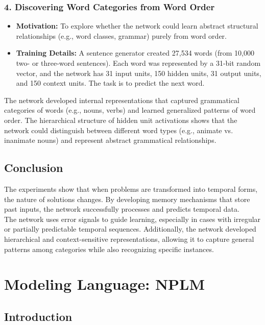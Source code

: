 \documentclass[11p,oneside]{book}
\begin{document}
\subsection*{4. Discovering Word Categories from Word Order}

\begin{itemize}
    \item \textbf{Motivation:} To explore whether the network could learn abstract structural relationships (e.g., word classes, grammar) purely from word order.
    \item \textbf{Training Details:} A sentence generator created 27,534 words (from 10,000 two- or three-word sentences). Each word was represented by a 31-bit random vector, and the network has 31 input units, 150 hidden units, 31 output units, and 150 context units. The task is to predict the next word.
\end{itemize}

The network developed internal representations that captured grammatical categories of words (e.g., nouns, verbs) and learned generalized patterns of word order. The hierarchical structure of hidden unit activations shows that the network could distinguish between different word types (e.g., animate vs. inanimate nouns) and represent abstract grammatical relationships. \\

\section*{Conclusion}

The experiments show that when problems are transformed into temporal forms, the nature of solutions changes. By developing memory mechanisms that store past inputs, the network successfully processes and predicts temporal data. \\

The network uses error signals to guide learning, especially in cases with irregular or partially predictable temporal sequences. Additionally, the network developed hierarchical and context-sensitive representations, allowing it to capture general patterns among categories while also recognizing specific instances. 

\chapter{Modeling Language: NPLM}

\section*{Introduction}
\end{document}
